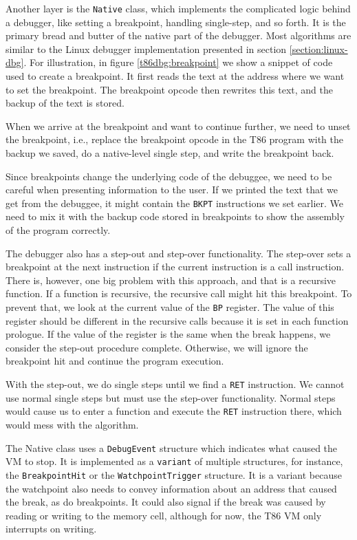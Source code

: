 Another layer is the \texttt{Native} class, which implements the complicated
logic behind a debugger, like setting a breakpoint, handling single-step, and
so forth. It is the primary bread and butter of the native part of the
debugger. Most algorithms are similar to the Linux debugger implementation
presented in section \ref{section:linux-dbg}. For illustration, in figure
\ref{t86dbg:breakpoint} we show a snippet of code used to create a breakpoint.
It first reads the text at the address where we want to set the breakpoint. The
breakpoint opcode then rewrites this text, and the backup of the text is
stored.

When we arrive at the breakpoint and want to continue further, we need to unset
the breakpoint, i.e., replace the breakpoint opcode in the T86 program with the
backup we saved, do a native-level single step, and write the breakpoint back.

Since breakpoints change the underlying code of the debuggee, we need to be
careful when presenting information to the user. If we printed the text that we
get from the debuggee, it might contain the \texttt{BKPT} instructions we set
earlier. We need to mix it with the backup code stored in breakpoints to show
the assembly of the program correctly.

The debugger also has a step-out and step-over functionality. The step-over
sets a breakpoint at the next instruction if the current instruction is a call
instruction. There is, however, one big problem with this approach, and that is
a recursive function. If a function is recursive, the recursive call might hit
this breakpoint. To prevent that, we look at the current value of the
\texttt{BP} register. The value of this register should be different in the
recursive calls because it is set in each function prologue. If the value of
the register is the same when the break happens, we consider the step-out
procedure complete. Otherwise, we will ignore the breakpoint hit and continue
the program execution.

With the step-out, we do single steps until we find a \texttt{RET} instruction.
We cannot use normal single steps but must use the step-over functionality.
Normal steps would cause us to enter a function and execute the \texttt{RET}
instruction there, which would mess with the algorithm.

The Native class uses a \texttt{DebugEvent} structure which indicates what
caused the VM to stop. It is implemented as a \texttt{variant} of multiple
structures, for instance, the \texttt{BreakpointHit} or the
\texttt{WatchpointTrigger} structure. It is a variant because the watchpoint
also needs to convey information about an address that caused the break, as do
breakpoints. It could also signal if the break was caused by reading or writing
to the memory cell, although for now, the T86 VM only interrupts on writing.

